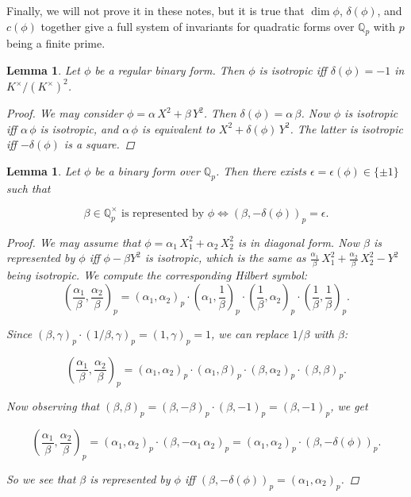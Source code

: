 \documentclass{article}
\newcommand{\QQ}{\mathbb{Q}}
\theoremstyle{myplain}
\newtheorem{lemma}[proposition]{Lemma}
\theoremstyle{mydefinition}
\begin{document}
Finally, we will not prove it in these notes, but it is true that $\dim \phi$,
$\delta (\phi)$, and $c (\phi)$ together give a full system of invariants for
quadratic forms over $\QQ_p$ with $p$ being a finite prime.

\begin{lemma}\label{lemma:discr-of-isotropic-binary-form}
  Let $\phi$ be a regular binary form. Then $\phi$ is isotropic iff
  $\delta (\phi) = -1$ in $K^\times / (K^\times)^2$.

  \begin{proof}
    We may consider $\phi = \alpha\,X^2 + \beta\,Y^2$. Then
    $\delta (\phi) = \alpha\,\beta$. Now $\phi$ is isotropic iff $\alpha\,\phi$
    is isotropic, and $\alpha\,\phi$ is equivalent to
    $X^2 + \delta (\phi) \, Y^2$. The latter is isotropic iff $-\delta (\phi)$
    is a square.
  \end{proof}
\end{lemma}

\begin{lemma}\label{lemma:binary-hasse}
  Let $\phi$ be a binary form over $\QQ_p$. Then there exists
  $\epsilon = \epsilon (\phi) \in \{ \pm 1 \}$ such that

  \[ \beta \in \QQ_p^\times\text{ is represented by }\phi \iff (\beta, -\delta(\phi))_p = \epsilon. \]

  \begin{proof}
    We may assume that $\phi = \alpha_1\,X_1^2 + \alpha_2\,X_2^2$ is in diagonal
    form. Now $\beta$ is represented by $\phi$ iff $\phi - \beta Y^2$ is
    isotropic, which is the same as
    $\frac{\alpha_1}{\beta}\,X_1^2 + \frac{\alpha_2}{\beta}\,X_2^2 - Y^2$ being
    isotropic. We compute the corresponding Hilbert symbol:
    \[ \left(\frac{\alpha_1}{\beta}, \frac{\alpha_2}{\beta}\right)_p =
      \left(\alpha_1, \alpha_2\right)_p \cdot
      \left(\alpha_1, \frac{1}{\beta}\right)_p \cdot
      \left(\frac{1}{\beta}, \alpha_2\right)_p \cdot
      \left(\frac{1}{\beta}, \frac{1}{\beta}\right)_p. \]

    Since $(\beta, \gamma)_p \cdot (1/\beta, \gamma)_p = (1,\gamma)_p = 1$, we
    can replace $1/\beta$ with $\beta$:

    \[ \left(\frac{\alpha_1}{\beta}, \frac{\alpha_2}{\beta}\right)_p =
      \left(\alpha_1, \alpha_2\right)_p \cdot
      \left(\alpha_1, \beta\right)_p \cdot
      \left(\beta, \alpha_2\right)_p \cdot
      \left(\beta, \beta\right)_p. \]

    Now observing that
    $\left(\beta, \beta\right)_p = (\beta,-\beta)_p \cdot (\beta, -1)_p =
    \left(\beta, -1\right)_p$, we get

    \[ \left(\frac{\alpha_1}{\beta}, \frac{\alpha_2}{\beta}\right)_p =
      (\alpha_1, \alpha_2)_p \cdot (\beta, -\alpha_1\,\alpha_2)_p =
      (\alpha_1, \alpha_2)_p \cdot (\beta, -\delta (\phi))_p. \]

    So we see that $\beta$ is represented by $\phi$ iff
    $(\beta,-\delta(\phi))_p = (\alpha_1,\alpha_2)_p$.
  \end{proof}
\end{lemma}
\end{document}
